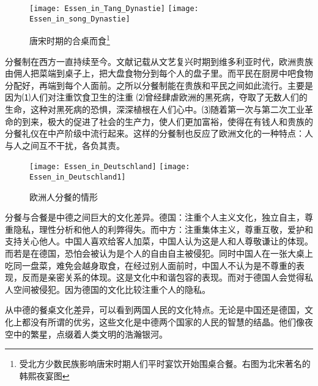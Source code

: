 \begin{figure}
\centering
\texttt{[image: Essen\_in\_Tang\_Dynastie]}
\texttt{[image: Essen\_in\_song\_Dynastie]}
\caption{唐宋时期的合桌而食\protect\footnote{受北方少数民族影响唐宋时期人们平时宴饮开始围桌合餐。右图为北宋著名的韩熙夜宴图}}
\end{figure}
\par
分餐制在西方一直持续至今。文献记载从文艺复兴时期到维多利亚时代，欧洲贵族由佣人把菜端到桌子上，把大盘食物分到每个人的盘子里。而平民在厨房中吧食物分配好，再端到每个人面前。之所以分餐制能在贵族和平民之间如此流行。主要是因为⑴人们对注重饮食卫生的注重 ⑵曾经肆虐欧洲的黑死病，夺取了无数人们的生命，这种对黑死病的恐惧，深深植根在人们心中。⑶随着第一次与第二次工业革命的到来，极大的促进了社会的生产力，使人们更加富裕，使得在有钱人和贵族的分餐礼仪在中产阶级中流行起来。这样的分餐制也反应了欧洲文化的一种特点：人与人之间互不干扰，各负其责。
\begin{figure}
\centering
\texttt{[image: Essen\_in\_Deutschland]}
\texttt{[image: Essen\_in\_Deutschland1]}
\caption{欧洲人分餐的情形}
\end{figure}

\par
分餐与合餐是中德之间巨大的文化差异。德国：注重个人主义文化，独立自主，尊重隐私，理性分析和他人的利弊得失。而中方：注重集体主义，尊重互敬，爱护和支持关心他人。中国人喜欢给客人加菜，中国人认为这是人和人尊敬谦让的体现。而若是在德国，恐怕会被认为是个人的自由自主被侵犯。同时中国人在一张大桌上吃同一盘菜，难免会越身取食，在经过别人面前时，中国人不认为是不尊重的表现，反而是亲密关系的体现。这是文化中和谐包容的表现。而对于德国人会觉得私人空间被侵犯。因为德国的文化比较注重个人的隐私。
\par
从中德的餐桌文化差异，可以看到两国人民的文化特点。无论是中国还是德国，文化上都没有所谓的优劣，这些文化是中德两个国家的人民的智慧的结晶。他们像夜空中的繁星，点缀着人类文明的浩瀚银河。
